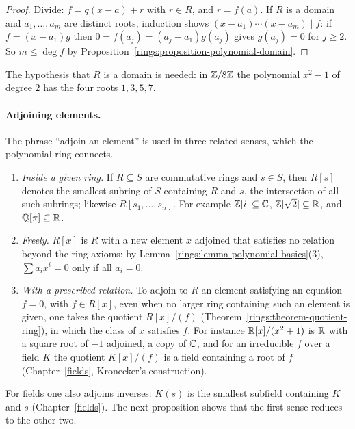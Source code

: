 \begin{proof}
Divide: $f = q(x - a) + r$ with $r \in R$, and $r = f(a)$. If $R$ is a domain and
$a_1, \ldots, a_m$ are distinct roots, induction shows
$(x - a_1) \cdots (x - a_m) \mid f$: if $f = (x - a_1)g$ then $0 = f(a_j) = (a_j - a_1)g(a_j)$
gives $g(a_j) = 0$ for $j \geq 2$. So $m \leq \deg f$ by
Proposition~\ref{rings:proposition-polynomial-domain}.
\end{proof}

\begin{counterexample}\label{rings:counterexample-many-roots}
The hypothesis that $R$ is a domain is needed: in $\mathbb{Z}/8\mathbb{Z}$ the polynomial $x^2 - 1$ of
degree $2$ has the four roots $1, 3, 5, 7$.
\end{counterexample}

\paragraph{Adjoining elements.} The phrase ``adjoin an element'' is used in three related senses, which the polynomial ring connects.
\begin{enumerate}
\item \emph{Inside a given ring.} If $R \subseteq S$ are commutative rings and $s \in S$, then $R[s]$ denotes the smallest subring of $S$ containing $R$ and $s$, the intersection of all such subrings; likewise $R[s_1, \ldots, s_n]$. For
example $\mathbb{Z}[i] \subseteq \mathbb{C}$, $\mathbb{Z}[\sqrt 2] \subseteq \mathbb{R}$, and $\mathbb{Q}[\pi] \subseteq \mathbb{R}$.
\item \emph{Freely.} $R[x]$ is $R$ with a new element $x$ adjoined that satisfies no relation beyond the ring axioms: by Lemma~\ref{rings:lemma-polynomial-basics}(3), $\sum a_ix^i = 0$ only if all $a_i = 0$.
\item \emph{With a prescribed relation.} To adjoin to $R$ an element satisfying an equation $f = 0$, with $f \in R[x]$, even when no larger ring containing such an element is given, one takes the quotient $R[x]/(f)$
(Theorem~\ref{rings:theorem-quotient-ring}), in which the class of $x$ satisfies $f$. For instance $\mathbb{R}[x]/(x^2 + 1)$ is $\mathbb{R}$ with a square root of $-1$ adjoined, a copy of $\mathbb{C}$, and for an irreducible $f$ over a field $K$
the quotient $K[x]/(f)$ is a field containing a root of $f$ (Chapter~\ref{fields}, Kronecker's construction).
\end{enumerate}
For fields one also adjoins inverses: $K(s)$ is the smallest subfield containing $K$ and $s$ (Chapter~\ref{fields}). The next proposition shows that the first sense reduces to the other two.

